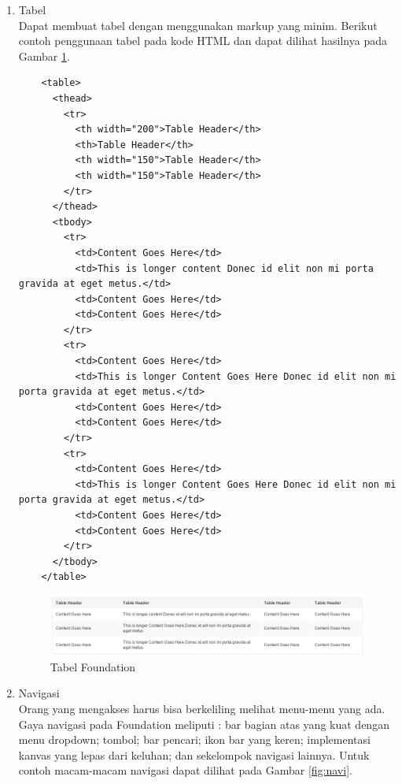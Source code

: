\begin{enumerate}[(1)]
\item Tabel\\
Dapat membuat tabel dengan menggunakan markup yang minim. Berikut contoh
penggunaan tabel pada kode HTML dan dapat dilihat hasilnya pada Gambar
\ref{fig:tabel}.
	\begin{lstlisting}
  	<table>
	  <thead>
	    <tr>
	      <th width="200">Table Header</th>
	      <th>Table Header</th>
	      <th width="150">Table Header</th>
	      <th width="150">Table Header</th>
	    </tr>
	  </thead>
	  <tbody>
	    <tr>
	      <td>Content Goes Here</td>
	      <td>This is longer content Donec id elit non mi porta gravida at eget metus.</td>
	      <td>Content Goes Here</td>
	      <td>Content Goes Here</td>
	    </tr>
	    <tr>
	      <td>Content Goes Here</td>
	      <td>This is longer Content Goes Here Donec id elit non mi porta gravida at eget metus.</td>
	      <td>Content Goes Here</td>
	      <td>Content Goes Here</td>
	    </tr>
	    <tr>
	      <td>Content Goes Here</td>
	      <td>This is longer Content Goes Here Donec id elit non mi porta gravida at eget metus.</td>
	      <td>Content Goes Here</td>
	      <td>Content Goes Here</td>
	    </tr>
	  </tbody>
	</table>
  	\end{lstlisting}
  	\begin{figure}[H]
	\centering
	\includegraphics[scale=0.6]{Gambar/tabel.png}
	\caption[Tabel Foundation]{Tabel Foundation}
	\label{fig:tabel}
	\end{figure}
\item Navigasi\\
Orang yang mengakses harus bisa berkeliling melihat menu-menu yang ada. Gaya
navigasi pada Foundation meliputi : bar bagian atas yang kuat dengan menu
dropdown; tombol; bar pencari; ikon bar yang keren; implementasi kanvas yang
lepas dari keluhan; dan sekelompok navigasi lainnya. Untuk contoh macam-macam
navigasi dapat dilihat pada Gambar \ref{fig:navi}.
\begin{figure}[H]
\centering

\end{figure}
\end{enumerate}
